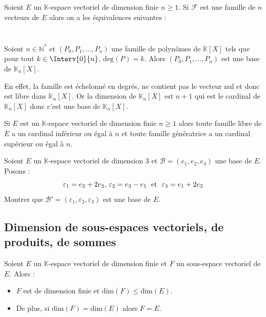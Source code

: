 \documentclass[a4paper,10pt]{report}
\begin{document}
 \begin{prop}
 Soient $E$ un $\mathbb{K}$-espace vectoriel de dimension finie $n \geq 1$. Si $\mathcal{F}$ est une famille de $n$ vecteurs de $E$ alors on a les équivalences suivantes : 
$$ \phantom{\mathcal{F} \hbox{ est une base de E} \Longleftrightarrow \mathcal{F} \hbox{ est libre } \Longleftrightarrow \mathcal{F} \hbox{ est génératrice de E }}$$
\end{prop}

\begin{ex} Soient $n \in \mathbb{N}^*$ et $(P_0,P_1, \ldots, P_n)$ une famille de polynômes de $\mathbb{K}[X]$ tels que pour tout $k \in \Interv{0}{n}$, $\textrm{deg}(P) = k$. Alors $(P_0,P_1, \ldots, P_n)$ est une base de $\mathbb{K}_n[X]$.

\noindent En effet, la famille est échelonné en degrés, ne contient pas le vecteur nul et donc est libre dans $\mathbb{K}_n[X]$. Or la dimension de $\mathbb{K}_n[X]$ est $n+1$ qui est le cardinal de $\mathbb{K}_n[X]$ donc c'est une base de $\mathbb{K}_n[X]$.
\end{ex}

\medskip

\begin{rem} Si $E$ est un $\mathbb{K}$-espace vectoriel de dimension finie $n \geq 1$ alors toute famille libre de $E$ a un cardinal inférieur ou égal à $n$ et toute famille génératrice a un cardinal supérieur ou égal à $n$.
\end{rem}

\begin{exa} Soient $E$ un $\mathbb{K}$-espace vectoriel de dimension 3 et $\mathcal{B} = (e_{1} ,e_{2} ,e_{3})$ une base de $E$. Posons :
  \[
  \varepsilon_{1} = e_{2} + 2e_{3} , \, \varepsilon_{2} = e_{3} - e_{1} \; \hbox{ et } \; \varepsilon_{3} = e_{1} + 2e_{2}
  \]
Montrer que $\mathcal{B}' = (\varepsilon_{1} ,\varepsilon_{2} ,\varepsilon_{3})$ est une base de $E$.
\end{exa}

\subsection{Dimension de sous-espaces vectoriels, de produits, de sommes}

\begin{prop}  Soient $E$ un $\mathbb{K}$-espace vectoriel de dimension finie et $F$ un sous-espace vectoriel de $E$. Alors :

\begin{itemize}
\item $F$ est de dimension finie et $\textrm{dim}(F) \leq \textrm{dim}(E)$.
\item De plus, si $\textrm{dim}(F) = \textrm{dim}(E)$ alors $F=E$.
\end{itemize}
\end{prop}
\end{document}

